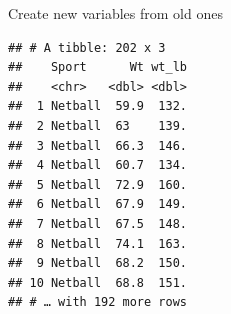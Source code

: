 \documentclass[
  ignorenonframetext,
]{beamer}
\newenvironment{Shaded}{\begin{snugshade}}{\end{snugshade}}
\newcommand{\DataTypeTok}[1]{\textcolor[rgb]{0.13,0.29,0.53}{#1}}
\newcommand{\FloatTok}[1]{\textcolor[rgb]{0.00,0.00,0.81}{#1}}
\newcommand{\KeywordTok}[1]{\textcolor[rgb]{0.13,0.29,0.53}{\textbf{#1}}}
\newcommand{\NormalTok}[1]{#1}
\newcommand{\OperatorTok}[1]{\textcolor[rgb]{0.81,0.36,0.00}{\textbf{#1}}}
\newcommand{\StringTok}[1]{\textcolor[rgb]{0.31,0.60,0.02}{#1}}
\begin{document}
\begin{frame}[fragile]{Create new variables from old ones}
\protect\hypertarget{create-new-variables-from-old-ones}{}

\begin{Shaded}
\end{Shaded}

\begin{verbatim}
## # A tibble: 202 x 3
##    Sport      Wt wt_lb
##    <chr>   <dbl> <dbl>
##  1 Netball  59.9  132.
##  2 Netball  63    139.
##  3 Netball  66.3  146.
##  4 Netball  60.7  134.
##  5 Netball  72.9  160.
##  6 Netball  67.9  149.
##  7 Netball  67.5  148.
##  8 Netball  74.1  163.
##  9 Netball  68.2  150.
## 10 Netball  68.8  151.
## # … with 192 more rows
\end{verbatim}

\end{frame}
\end{document}
